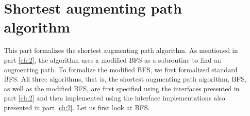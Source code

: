\part{Shortest augmenting path algorithm}
\label{ch:3}

This part formalizes the shortest augmenting path algorithm. As mentioned in part \ref{ch:2}, the algorithm uses a modified BFS as a subroutine to find an augmenting path. To formalize the modified BFS, we first formalized standard BFS. All three algorithms, that is, the shortest augmenting path algorithm, BFS, as well as the modified BFS, are first specified using the interfaces presented in part \ref{ch:2} and then implemented using the interface implementations also presented in part \ref{ch:2}. Let us first look at BFS.